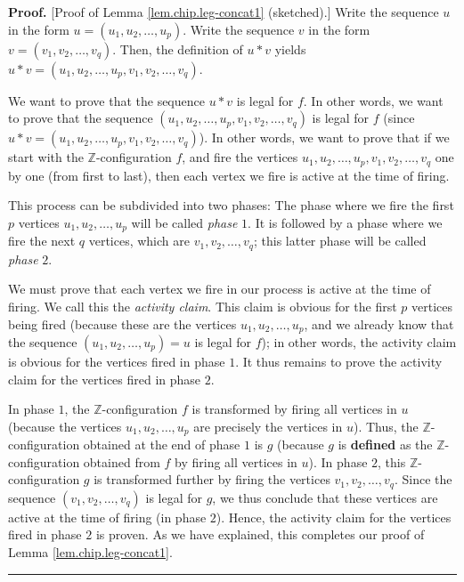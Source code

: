 \documentclass[numbers=enddot,12pt,final,onecolumn,notitlepage]{scrartcl}%
\theoremstyle{definition}
\newenvironment{proof}[1][Proof]{\noindent\textbf{#1.} }{\ \rule{0.5em}{0.5em}}
\begin{document}
\begin{proof}
[Proof of Lemma \ref{lem.chip.leg-concat1} (sketched).] Write the sequence $u$
in the form $u=\left(  u_{1},u_{2},\ldots,u_{p}\right)  $. Write the sequence
$v$ in the form $v=\left(  v_{1},v_{2},\ldots,v_{q}\right)  $. Then, the
definition of $u\ast v$ yields  $u\ast v=\left(  u_{1},u_{2},\ldots
,u_{p},v_{1},v_{2},\ldots,v_{q}\right)  $.

We want to prove that the sequence $u\ast v$ is legal for $f$. In other words,
we want to prove that the sequence $\left(  u_{1},u_{2},\ldots,u_{p}%
,v_{1},v_{2},\ldots,v_{q}\right)  $ is legal for $f$ (since $u\ast v=\left(
u_{1},u_{2},\ldots,u_{p},v_{1},v_{2},\ldots,v_{q}\right)  $). In other words,
we want to prove that if we start with the $\mathbb{Z}$-configuration $f$, and
fire the vertices $u_{1},u_{2},\ldots,u_{p},v_{1},v_{2},\ldots,v_{q}$ one by
one (from first to last), then each vertex we fire is active at the time of firing.

This process can be subdivided into two phases: The phase where we fire the
first $p$ vertices $u_{1},u_{2},\ldots,u_{p}$ will be called \textit{phase
}$1$. It is followed by a phase where we fire the next $q$ vertices, which are
$v_{1},v_{2},\ldots,v_{q}$; this latter phase will be called \textit{phase
}$2$.

We must prove that each vertex we fire in our process is active at the time of
firing. We call this the \textit{activity claim}. This claim is obvious for
the first $p$ vertices being fired (because these are the vertices
$u_{1},u_{2},\ldots,u_{p}$, and we already know that the sequence $\left(
u_{1},u_{2},\ldots,u_{p}\right)  =u$ is legal for $f$); in other words, the
activity claim is obvious for the vertices fired in phase $1$. It thus remains
to prove the activity claim for the vertices fired in phase $2$.

In phase $1$, the $\mathbb{Z}$-configuration $f$ is transformed by firing all
vertices in $u$ (because the vertices $u_{1},u_{2},\ldots,u_{p}$ are precisely
the vertices in $u$). Thus, the $\mathbb{Z}$-configuration obtained at the end
of phase $1$ is $g$ (because $g$ is \textbf{defined} as the $\mathbb{Z}%
$-configuration obtained from $f$ by firing all vertices in $u$). In phase
$2$, this $\mathbb{Z}$-configuration $g$ is transformed further by firing the
vertices $v_{1},v_{2},\ldots,v_{q}$. Since the sequence $\left(  v_{1}%
,v_{2},\ldots,v_{q}\right)  $ is legal for $g$, we thus conclude that these
vertices are active at the time of firing (in phase $2$). Hence, the activity
claim for the vertices fired in phase $2$ is proven. As we have explained,
this completes our proof of Lemma \ref{lem.chip.leg-concat1}.
\end{proof}
\end{document}
